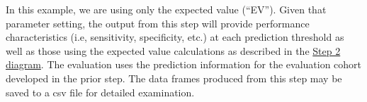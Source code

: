 \documentclass[
]{article}
\begin{document}
In this example, we are using only the expected value (``EV''). Given
that parameter setting, the output from this step will provide
performance characteristics (i.e, sensitivity, specificity, etc.) at
each prediction threshold as well as those using the expected value
calculations as described in the \href{vignettes/Figure2.png}{Step 2
diagram}. The evaluation uses the prediction information for the
evaluation cohort developed in the prior step. The data frames produced
from this step may be saved to a csv file for detailed examination.
\end{document}
